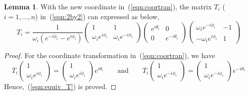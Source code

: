 \documentclass[11pt,fceqn]{article}
\numberwithin{equation}{section}
\theoremstyle{definition}
\newtheorem{lem}[thm]{Lemma}
\begin{document}
\begin{lem}
\label{lem:equiv_express}
With the new coordinate in~(\ref{eqn:coortran}), the matrix $T_{i}$ ($i = 1, \ldots, n$) in~(\ref{eqn:2by2}) can expressed as below, 
\begin{equation}
\label{eqn:equiv_T}
T_{i} = \frac{1}{\omega_{i} \left(e^{-i\phi_{i}} - e^{i\phi_{i}}\right)}
           \begin{pmatrix}
           1 & 1 \\
           \omega_{i} e^{i\phi_{i}} & \omega_{i} e^{-i\phi_{i}}
           \end{pmatrix}\begin{pmatrix}
           e^{i\theta_{i}} & 0 \\
           0 & e^{-i\theta_{i}}
           \end{pmatrix}\begin{pmatrix}
           \omega_{i} e^{-i\phi_{i}} & -1 \\
           -\omega_{i} e^{i\phi_{i}} & 1
           \end{pmatrix}
\end{equation}
\end{lem}
\begin{proof}
For the coordinate transformation in~(\ref{eqn:coortran}), we have
$$
T_{i} \begin{pmatrix}
       1 \\
       \omega_{i}e^{i\phi_{i}}
      \end{pmatrix} = \begin{pmatrix}
       1 \\
       \omega_{i}e^{i\phi_{i}}
      \end{pmatrix}  e^{i\theta_{i}}     \qquad \text{and}\qquad T_{i} \begin{pmatrix}
       1 \\
       \omega_{i}e^{-i\phi_{i}}
      \end{pmatrix} = \begin{pmatrix}
       1 \\
       \omega_{i}e^{-i\phi_{i}} 
      \end{pmatrix} e^{-i\theta_{i}}
$$
Hence,~(\ref{eqn:equiv_T}) is proved.
\end{proof}
\end{document}
